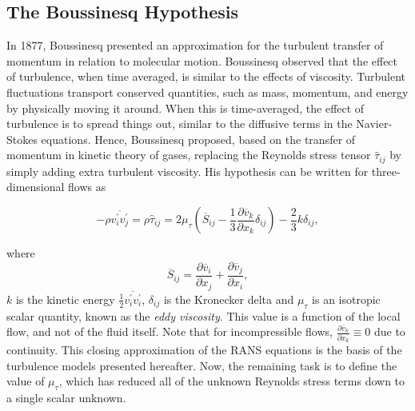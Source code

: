 \subsection{The Boussinesq Hypothesis}
In 1877, Boussinesq presented an approximation for the turbulent transfer of momentum in relation to molecular motion. Boussinesq observed that the effect of turbulence, when time averaged, is similar to the effects of viscosity. Turbulent fluctuations transport conserved quantities, such as mass, momentum, and energy by physically moving it around. When this is time-averaged, the effect of turbulence is to spread things out, similar to the diffusive terms in the Navier-Stokes equations. Hence, Boussinesq proposed, based on the transfer of momentum in kinetic theory of gases, replacing the Reynolds stress tensor $\hat \tau_{ij}$ by simply adding extra turbulent viscosity.  His hypothesis can be written for three-dimensional flows as
\begin{eqBox}
\begin{equation}
    -\rho \overline{v_i^\prime v_j^\prime} = \rho \hat \tau_{ij} =
        2 \mu_\tau \left(\overline S_{ij} - \frac{1}{3} \frac{\partial \overline v_k}{\partial x_k}\delta_{ij}
        \right) - \frac{2}{3} k \delta_{ij},
    \label{eq:boussinesq_approximation}
\end{equation}
\end{eqBox}
where
\begin{equation}
    \overline S_{ij} = 
    \frac{\partial \overline v_i}{\partial x_j} 
		+ \frac{\partial \overline v_j}{\partial x_i},
		\label{eq:meanstrainrate}
\end{equation}
$k$ is the kinetic energy $\frac{1}{2}\overline{v_i^\prime v_i^\prime}$, $\delta_{ij}$ is the Kronecker delta and $\mu_\tau$ is an isotropic scalar quantity, known as the \textit{eddy viscosity}. This value is a function of the local flow, and not of the fluid itself. Note that for incompressible flows, $\frac{\partial \overline v_k}{\partial x_k}\equiv0$ due to continuity. This closing approximation of the RANS equations is the basis of the turbulence models presented hereafter. Now, the remaining task is to define the value of $\mu_\tau$, which has reduced all of the unknown Reynolds stress terms down to a single scalar unknown. 

